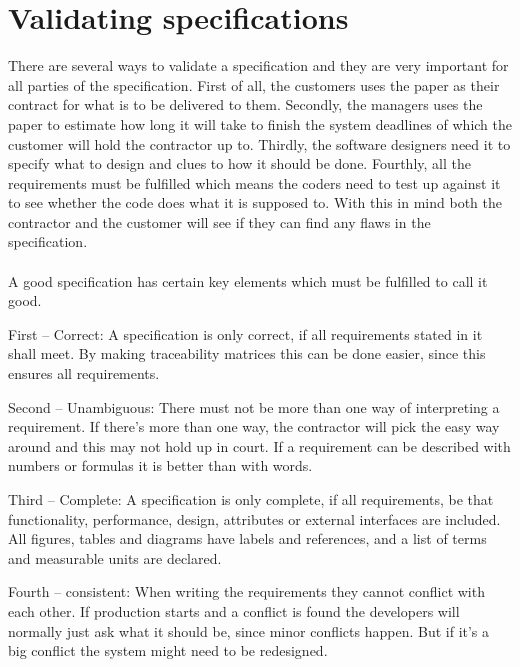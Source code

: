 \documentclass[Main]{subfiles}
\begin{document}
\section{Validating specifications}


There are several ways to validate a specification and they are very important for all parties of the specification.
First of all, the customers uses the paper as their contract for what is to be delivered to them.
Secondly, the managers uses the paper to estimate how long it will take to finish the system deadlines of which the customer will hold the contractor up to.
Thirdly, the software designers need it to specify what to design and clues to how it should be done.
Fourthly, all the requirements must be fulfilled which means the coders need to test up against it to see whether the code does what it is supposed to.
With this in mind both the contractor and the customer will see if they can find any flaws in the specification.
\\
\\
A good specification has certain key elements which must be fulfilled to call it good.


First -- Correct:
A specification is only correct, if all requirements stated in it shall meet.
By making traceability matrices this can be done easier, since this ensures all requirements.

Second -- Unambiguous:
There must not be more than one way of interpreting a requirement. 
If there's more than one way, the contractor will pick the easy way around and this may not hold up in court.
If a requirement can be described with numbers or formulas it is better than with words.

Third -- Complete:
A specification is only complete, if all requirements, be that functionality, performance, design, attributes or external interfaces are included.
All figures, tables and diagrams have labels and references, and a list of terms and measurable units are declared.

Fourth -- consistent:
When writing the requirements they cannot conflict with each other.
If production starts and a conflict is found the developers will normally just ask what it should be, since minor conflicts happen.
But if it's a big conflict the system might need to be redesigned. 
\end{document}
